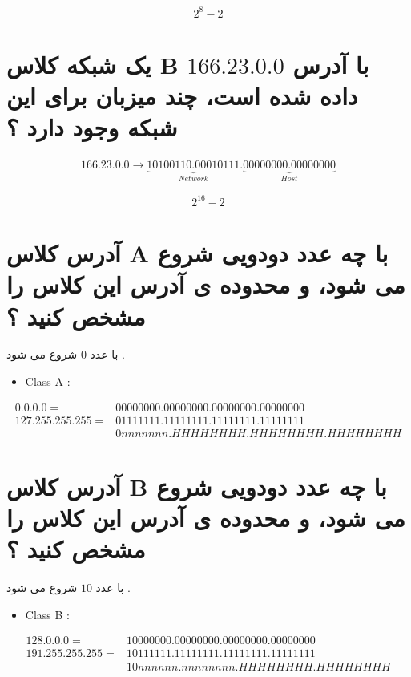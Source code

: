 \documentclass{article}
\begin{document}
{
\LARGE
$$
2^{8} - 2
$$
}



\section{یک شبکه کلاس B با آدرس 
$
166.23.0.0
$
داده شده است، چند میزبان برای  این شبکه وجود دارد ؟ 
}


\begin{align*}
166.23.0.0 \to \underbrace{10100110.00010111}_{Network}.\underbrace{00000000.00000000}_{Host}
\end{align*}

{
\LARGE
$$
2^{16} - 2
$$
}


\section{آدرس کلاس
A
با چه عدد دودویی شروع می شود، و محدوده ی آدرس این کلاس را مشخص کنید ؟}

با عدد $0$ شروع می شود .


\begin{latin}
\begin{itemize}
	\item Class A :
\end{itemize}
\end{latin}
\begin{align*}
 0.  0.  0.  0 = &00000000.00000000.00000000.00000000 \\
127.255.255.255 = &01111111.11111111.11111111.11111111 \\
                  &0nnnnnnn.HHHHHHHH.HHHHHHHH.HHHHHHHH
\end{align*}




\section{آدرس کلاس
B
با چه عدد دودویی شروع می شود، و محدوده ی آدرس این کلاس را مشخص کنید ؟}


با عدد $10$ شروع می شود .

\begin{latin}
\begin{itemize}
	\item Class B :
\end{itemize}
\end{latin}
\begin{align*}
128.  0.  0.  0 = &10000000.00000000.00000000.00000000 \\
191.255.255.255 = &10111111.11111111.11111111.11111111 \\
                  &10nnnnnn.nnnnnnnn.HHHHHHHH.HHHHHHHH
\end{align*}
\end{document}

